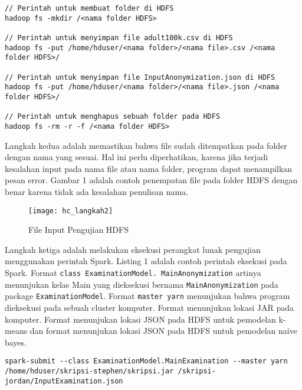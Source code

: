 \begin{lstlisting}[basicstyle=\ttfamily, frame=single,
	columns=fullflexible, keepspaces=true, breaklines=true, label=lst:pl_csv, caption=Perintah Spark untuk Perangkat Lunak Pengujian]
// Perintah untuk membuat folder di HDFS
hadoop fs -mkdir /<nama folder HDFS>

// Perintah untuk menyimpan file adult100k.csv di HDFS
hadoop fs -put /home/hduser/<nama folder>/<nama file>.csv /<nama folder HDFS>/

// Perintah untuk menyimpan file InputAnonymization.json di HDFS
hadoop fs -put /home/hduser/<nama folder>/<nama file>.json /<nama folder HDFS>/

// Perintah untuk menghapus sebuah folder pada HDFS
hadoop fs -rm -r -f /<nama folder HDFS>

\end{lstlisting}

\vspace{0.4cm}
Langkah kedua adalah memastikan bahwa file sudah ditempatkan pada folder dengan nama yang sesuai. Hal ini perlu diperhatikan, karena jika terjadi kesalahan input pada nama file atau nama folder, program dapat menampilkan pesan error. Gambar 1 adalah contoh penempatan file pada folder HDFS dengan benar karena tidak ada kesalahan penulisan nama.

\begin{figure}[H]
	\centering
	\texttt{[image: hc\_langkah2]}
	\caption{File Input Pengujian HDFS}
	\label{fig:pertama2}
\end{figure}

Langkah ketiga adalah melakukan eksekusi perangkat lunak pengujian menggunakan perintah Spark. Listing 1 adalah contoh perintah eksekusi pada Spark. Format \texttt{\textemdash\textemdash class ExaminationModel. MainAnonymization} artinya menunjukan kelas Main yang dieksekusi bernama \texttt{MainAnonymization} pada package \texttt{ExaminationModel}. Format \texttt{\textemdash\textemdash master yarn} menunjukan bahwa program dieksekusi pada sebuah cluster komputer. Format  menunjukan lokasi JAR pada komputer. Format  menunjukan lokasi JSON  pada HDFS untuk pemodelan k-means dan format  menunjukan lokasi JSON pada HDFS untuk pemodelan naive bayes. 

\newpage

\begin{lstlisting}[basicstyle=\ttfamily, frame=single,
	columns=fullflexible, keepspaces=true, breaklines=true, label=lst:pl_csv, caption=Perintah Eksekusi Spark]
spark-submit --class ExaminationModel.MainExamination --master yarn /home/hduser/skripsi-stephen/skripsi.jar /skripsi-jordan/InputExamination.json

\end{lstlisting}


